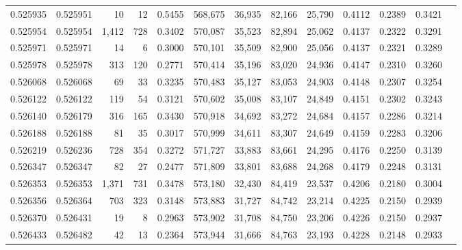 \begin{tabular}{rrrrrrrrrrrrr}
0.525935 & 0.525951 &    10 &    12 &                                     0.5455 & 568,675 &  36,935 &  82,166 &  25,790 & 0.4112 & 0.2389 & 0.3421 \\
0.525954 & 0.525954 & 1,412 &   728 &                                     0.3402 & 570,087 &  35,523 &  82,894 &  25,062 & 0.4137 & 0.2322 & 0.3291 \\
0.525971 & 0.525971 &    14 &     6 &                                     0.3000 & 570,101 &  35,509 &  82,900 &  25,056 & 0.4137 & 0.2321 & 0.3289 \\
0.525978 & 0.525978 &   313 &   120 &                                     0.2771 & 570,414 &  35,196 &  83,020 &  24,936 & 0.4147 & 0.2310 & 0.3260 \\
0.526068 & 0.526068 &    69 &    33 &                                     0.3235 & 570,483 &  35,127 &  83,053 &  24,903 & 0.4148 & 0.2307 & 0.3254 \\
0.526122 & 0.526122 &   119 &    54 &                                     0.3121 & 570,602 &  35,008 &  83,107 &  24,849 & 0.4151 & 0.2302 & 0.3243 \\
0.526140 & 0.526179 &   316 &   165 &                                     0.3430 & 570,918 &  34,692 &  83,272 &  24,684 & 0.4157 & 0.2286 & 0.3214 \\
0.526188 & 0.526188 &    81 &    35 &                                     0.3017 & 570,999 &  34,611 &  83,307 &  24,649 & 0.4159 & 0.2283 & 0.3206 \\
0.526219 & 0.526236 &   728 &   354 &                                     0.3272 & 571,727 &  33,883 &  83,661 &  24,295 & 0.4176 & 0.2250 & 0.3139 \\
0.526347 & 0.526347 &    82 &    27 &                                     0.2477 & 571,809 &  33,801 &  83,688 &  24,268 & 0.4179 & 0.2248 & 0.3131 \\
0.526353 & 0.526353 & 1,371 &   731 &                                     0.3478 & 573,180 &  32,430 &  84,419 &  23,537 & 0.4206 & 0.2180 & 0.3004 \\
0.526356 & 0.526364 &   703 &   323 &                                     0.3148 & 573,883 &  31,727 &  84,742 &  23,214 & 0.4225 & 0.2150 & 0.2939 \\
0.526370 & 0.526431 &    19 &     8 &                                     0.2963 & 573,902 &  31,708 &  84,750 &  23,206 & 0.4226 & 0.2150 & 0.2937 \\
0.526433 & 0.526482 &    42 &    13 &                                     0.2364 & 573,944 &  31,666 &  84,763 &  23,193 & 0.4228 & 0.2148 & 0.2933 \\

\end{tabular}
